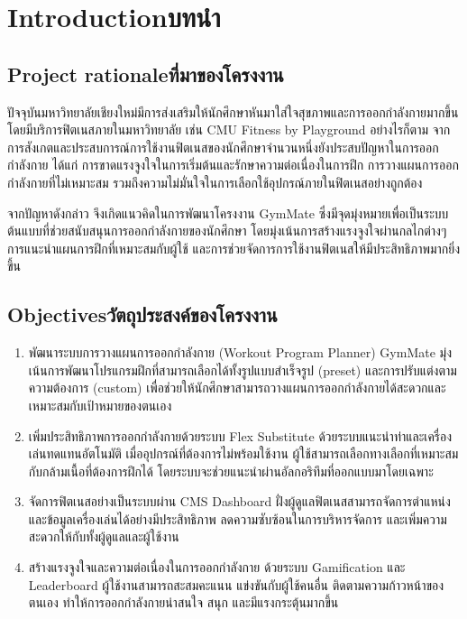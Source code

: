 \chapter{\ifenglish Introduction\else บทนำ\fi}

\section{\ifenglish Project rationale\else ที่มาของโครงงาน\fi}
\enskip ปัจจุบันมหาวิทยาลัยเชียงใหม่มีการส่งเสริมให้นักศึกษาหันมาใส่ใจสุขภาพและการออกกำลังกายมากขึ้น โดยมีบริการฟิตเนสภายในมหาวิทยาลัย เช่น CMU Fitness by Playground อย่างไรก็ตาม จากการสังเกตและประสบการณ์การใช้งานฟิตเนสของนักศึกษาจำนวนหนึ่งยังประสบปัญหาในการออกกำลังกาย ได้แก่ การขาดแรงจูงใจในการเริ่มต้นและรักษาความต่อเนื่องในการฝึก การวางแผนการออกกำลังกายที่ไม่เหมาะสม รวมถึงความไม่มั่นใจในการเลือกใช้อุปกรณ์ภายในฟิตเนสอย่างถูกต้อง

\enskip จากปัญหาดังกล่าว จึงเกิดแนวคิดในการพัฒนาโครงงาน GymMate ซึ่งมีจุดมุ่งหมายเพื่อเป็นระบบต้นแบบที่ช่วยสนับสนุนการออกกำลังกายของนักศึกษา โดยมุ่งเน้นการสร้างแรงจูงใจผ่านกลไกต่างๆ การแนะนำแผนการฝึกที่เหมาะสมกับผู้ใช้ และการช่วยจัดการการใช้งานฟิตเนสให้มีประสิทธิภาพมากยิ่งขึ้น

\section{\ifenglish Objectives\else วัตถุประสงค์ของโครงงาน\fi}
\setlength{\leftmargini}{1.25cm}
\begin{enumerate}
\renewcommand{\labelenumi}{1.2.\arabic{enumi}}
    \item พัฒนาระบบการวางแผนการออกกำลังกาย (Workout Program Planner)
    GymMate มุ่งเน้นการพัฒนาโปรแกรมฝึกที่สามารถเลือกได้ทั้งรูปแบบสำเร็จรูป (preset) และการปรับแต่งตามความต้องการ (custom) เพื่อช่วยให้นักศึกษาสามารถวางแผนการออกกำลังกายได้สะดวกและเหมาะสมกับเป้าหมายของตนเอง

    \item เพิ่มประสิทธิภาพการออกกำลังกายด้วยระบบ Flex Substitute
    ด้วยระบบแนะนำท่าและเครื่องเล่นทดแทนอัตโนมัติ เมื่ออุปกรณ์ที่ต้องการไม่พร้อมใช้งาน ผู้ใช้สามารถเลือกทางเลือกที่เหมาะสมกับกล้ามเนื้อที่ต้องการฝึกได้ โดยระบบจะช่วยแนะนำผ่านอัลกอริทึมที่ออกแบบมาโดยเฉพาะ

    \item จัดการฟิตเนสอย่างเป็นระบบผ่าน CMS Dashboard
    ฝั่งผู้ดูแลฟิตเนสสามารถจัดการตำแหน่งและข้อมูลเครื่องเล่นได้อย่างมีประสิทธิภาพ ลดความซับซ้อนในการบริหารจัดการ และเพิ่มความสะดวกให้กับทั้งผู้ดูแลและผู้ใช้งาน

    \item สร้างแรงจูงใจและความต่อเนื่องในการออกกำลังกาย
    ด้วยระบบ Gamification และ Leaderboard ผู้ใช้งานสามารถสะสมคะแนน แข่งขันกับผู้ใช้คนอื่น ติดตามความก้าวหน้าของตนเอง ทำให้การออกกำลังกายน่าสนใจ สนุก และมีแรงกระตุ้นมากขึ้น
\end{enumerate}

